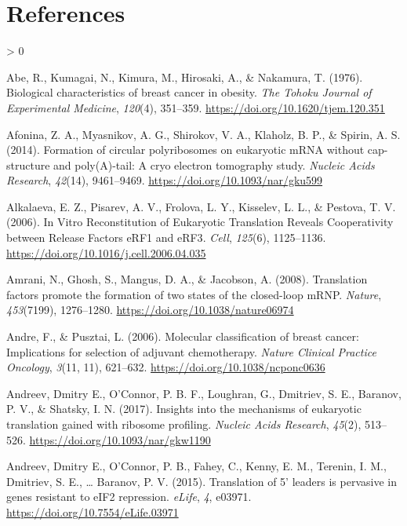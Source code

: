 \documentclass[
  12pt,
  openany]{book}
\newlength{\cslhangindent}
\newenvironment{CSLReferences}[2] %
 {%
  \setlength{\parindent}{0pt}
  \ifodd #1 \everypar{\setlength{\hangindent}{\cslhangindent}}\ignorespaces\fi
  \ifnum #2 > 0
  \setlength{\parskip}{#2\baselineskip}
  \fi
 }%
 {}
\begin{document}
\hypertarget{references}{%
\chapter*{References}\label{references}}

\hypertarget{refs}{}
\begin{CSLReferences}{1}{0}
\leavevmode\hypertarget{ref-Abe1976}{}%
Abe, R., Kumagai, N., Kimura, M., Hirosaki, A., \& Nakamura, T. (1976). Biological characteristics of breast cancer in obesity. \emph{The Tohoku Journal of Experimental Medicine}, \emph{120}(4), 351--359. \url{https://doi.org/10.1620/tjem.120.351}

\leavevmode\hypertarget{ref-Afonina2014}{}%
Afonina, Z. A., Myasnikov, A. G., Shirokov, V. A., Klaholz, B. P., \& Spirin, A. S. (2014). Formation of circular polyribosomes on eukaryotic {mRNA} without cap-structure and poly({A})-tail: A cryo electron tomography study. \emph{Nucleic Acids Research}, \emph{42}(14), 9461--9469. \url{https://doi.org/10.1093/nar/gku599}

\leavevmode\hypertarget{ref-Alkalaeva2006}{}%
Alkalaeva, E. Z., Pisarev, A. V., Frolova, L. Y., Kisselev, L. L., \& Pestova, T. V. (2006). In {Vitro Reconstitution} of {Eukaryotic Translation Reveals Cooperativity} between {Release Factors eRF1} and {eRF3}. \emph{Cell}, \emph{125}(6), 1125--1136. \url{https://doi.org/10.1016/j.cell.2006.04.035}

\leavevmode\hypertarget{ref-Amrani2008}{}%
Amrani, N., Ghosh, S., Mangus, D. A., \& Jacobson, A. (2008). Translation factors promote the formation of two states of the closed-loop {mRNP}. \emph{Nature}, \emph{453}(7199), 1276--1280. \url{https://doi.org/10.1038/nature06974}

\leavevmode\hypertarget{ref-Andre2006}{}%
Andre, F., \& Pusztai, L. (2006). Molecular classification of breast cancer: Implications for selection of adjuvant chemotherapy. \emph{Nature Clinical Practice Oncology}, \emph{3}(11, 11), 621--632. \url{https://doi.org/10.1038/ncponc0636}

\leavevmode\hypertarget{ref-Andreev2017}{}%
Andreev, Dmitry E., O'Connor, P. B. F., Loughran, G., Dmitriev, S. E., Baranov, P. V., \& Shatsky, I. N. (2017). Insights into the mechanisms of eukaryotic translation gained with ribosome profiling. \emph{Nucleic Acids Research}, \emph{45}(2), 513--526. \url{https://doi.org/10.1093/nar/gkw1190}

\leavevmode\hypertarget{ref-Andreev2015}{}%
Andreev, Dmitry E., O'Connor, P. B., Fahey, C., Kenny, E. M., Terenin, I. M., Dmitriev, S. E., \ldots{} Baranov, P. V. (2015). Translation of 5' leaders is pervasive in genes resistant to {eIF2} repression. \emph{eLife}, \emph{4}, e03971. \url{https://doi.org/10.7554/eLife.03971}


\end{CSLReferences}
\end{document}
